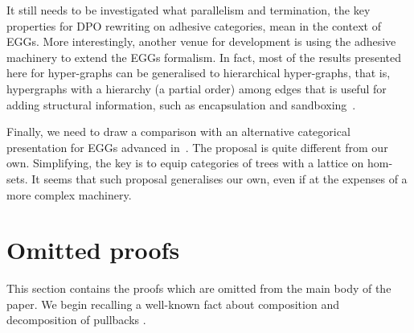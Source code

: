\documentclass[a4paper,UKenglish,cleveref,pdftex,thm-restate,numberwithinsect]{lipics-v2021}
\begin{document}
It still needs to be investigated what parallelism and termination, the key properties for DPO rewriting
on adhesive categories, 
mean in the context of EGGs. More interestingly, another venue for development is using the adhesive 
machinery to extend the EGGs formalism. In fact, most of the results
presented here for hyper-graphs can be generalised to hierarchical hyper-graphs, that is, 
hypergraphs with a hierarchy (a partial order) among 
edges that is useful for adding structural information, such as encapsulation and sandboxing~\cite{xxx}.

Finally, we need to draw a comparison with an alternative categorical presentation for EGGs 
advanced in~\cite{ghica}. The proposal is quite different from our own. Simplifying, the key is to equip categories 
of trees with a lattice on hom-sets. 
It seems that such proposal generalises our own, 
even if at the expenses of a more complex machinery.



\appendix

\section{Omitted proofs}

This section contains the proofs which are omitted from the main body of the paper. 
%
We begin recalling  a well-known fact about composition and decomposition of pullbacks \cite{mac2013categories}.
\end{document}
